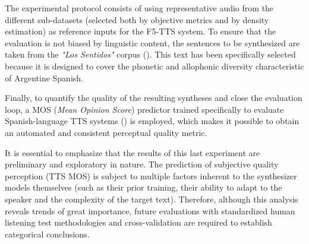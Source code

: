 The experimental protocol consists of using representative audio from the different sub-datasets (selected both by objective metrics and by density estimation) as reference inputs for the F5-TTS system. To ensure that the evaluation is not biased by linguistic content, the sentences to be synthesized are taken from the \textit{"Los Sentidos"} corpus (\cite{lossentidos}). This text has been specifically selected because it is designed to cover the phonetic and allophonic diversity characteristic of Argentine Spanish.

Finally, to quantify the quality of the resulting syntheses and close the evaluation loop, a MOS (\textit{Mean Opinion Score}) predictor trained specifically to evaluate Spanish-language TTS systems (\cite{sosawelford25_interspeech}) is employed, which makes it possible to obtain an automated and consistent perceptual quality metric.

It is essential to emphasize that the results of this last experiment are preliminary and exploratory in nature. The prediction of subjective quality perception (TTS MOS) is subject to multiple factors inherent to the synthesizer models themselves (such as their prior training, their ability to adapt to the speaker and the complexity of the target text). Therefore, although this analysis reveals trends of great importance, future evaluations with standardized human listening test methodologies and cross-validation are required to establish categorical conclusions.
